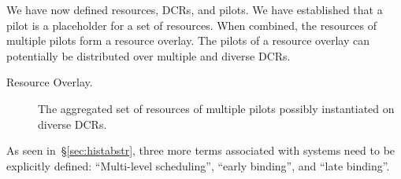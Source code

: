\documentclass{sig-alternate}
\begin{document}




We have now defined resources, DCRs, and pilots. We have established that a
pilot is a placeholder for a set of resources. When combined, the resources of
multiple pilots form a resource overlay. The pilots of a resource overlay can
potentially be distributed over multiple and diverse DCRs.



\begin{description}
\item[Resource Overlay.] The aggregated set of resources of multiple pilots possibly instantiated on diverse DCRs.
\end{description}

As seen in~\S\ref{sec:histabstr}, three more terms associated with \pilot
systems need to be explicitly defined: ``Multi-level scheduling'', ``early
binding'', and ``late binding''.


\end{document}
